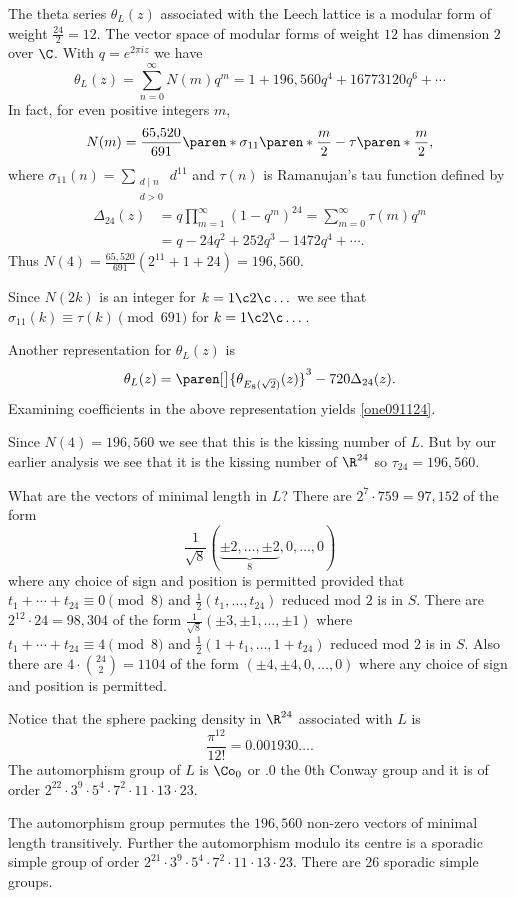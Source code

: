 The theta series $\theta_L(z)$ associated with the Leech lattice is a modular form of weight $\frac{24}{2}=12$.  The vector space of modular forms of weight $12$ has dimension $2$ over $\C$.  With $q=e^{2\pi iz}$ we have
\[ \theta_L(z) = \sum_{n=0}^\infty N(m) q^m = 1 + 196{,}560q^4 + 16773120q^6 + \dotsb \]
In fact, for even positive integers $m$,
\begin{equation} N(m) = \frac{65{,}520}{691}\paren*{\sigma_{11}\paren*{\frac{m}{2}}-\tau\paren*{\frac{m}{2}}} , \label{one091124} \end{equation}
where $\sigma_{11}(n) = \sum_{\substack{d\mid n\\d>0}}d^{11}$ and $\tau(n)$ is Ramanujan's tau function defined by
\begin{align*}
\Delta_{24}(z) &= q \prod_{m=1}^\infty(1-q^m)^{24} = \sum_{m=0}^\infty\tau(m)q^m \\
&= q - 24q^2 + 252q^3 - 1472q^4 + \dotsb .
\end{align*}
Thus $N(4)=\frac{65{,}520}{691}(2^{11}+1+24)=196{,}560$.

Since $N(2k)$ is an integer for $k=1\c 2\c \dotsc$ we see that $\sigma_{11}(k)\equiv\tau(k)\pmod{691}$ for $k=1\c 2\c \dotsc$.

Another representation for $\theta_L(z)$ is
\[ \theta_L(z) = \paren[\big]{\theta_{E_8(\sqrt2)}(z)}^3-720\Delta_{24}(z) . \]
Examining coefficients in the above representation yields \eqref{one091124}.

Since $N(4)=196{,}560$ we see that this is the kissing number of $L$.  But by our earlier analysis we see that it is the kissing number of $\R^{24}$ so $\tau_{24}=196{,}560$.

What are the vectors of minimal length in $L$?  There are $2^7\cdot759=97{,}152$ of the form
\[ \frac{1}{\sqrt8}(\underbrace{\pm2,\dotsc,\pm2}_8,0,\dotsc,0) \]
where any choice of sign and position is permitted provided that $t_1+\dotsb+t_{24}\equiv0\pmod8$ and $\frac12(t_1,\dotsc,t_{24})$ reduced mod $2$ is in $S$.  There are $2^{12}\cdot24=98{,}304$ of the form $\frac{1}{\sqrt8}(\pm3,\pm1,\dotsc,\pm1)$ where $t_1+\dotsb+t_{24}\equiv4\pmod8$ and $\frac12(1+t_1,\dotsc,1+t_{24})$ reduced mod $2$ is in $S$.  Also there are $4\cdot\binom{24}{2}=1104$ of the form $(\pm4,\pm4,0,\dotsc,0)$ where any choice of sign and position is permitted.

Notice that the sphere packing density in $\R^{24}$ associated with $L$ is
\[ \frac{\pi^{12}}{12!} = 0.001930\ldots . \]
The automorphism group of $L$ is $\Co_0$ or $.0$ the $0$th Conway group and it is of order $2^{22}\cdot3^9\cdot5^4\cdot7^2\cdot11\cdot13\cdot23$.

The automorphism group permutes the $196{,}560$ non-zero vectors of minimal length transitively.  Further the automorphism modulo its centre is a sporadic simple group of order $2^{21}\cdot3^9\cdot5^4\cdot7^2\cdot11\cdot13\cdot23$.  There are 26 sporadic simple groups.
